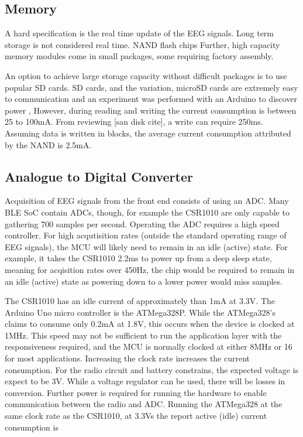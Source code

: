 \documentclass[]{article}
\begin{document}
\subsection{Memory}

 A hard specification is the real time update of the \ac{EEG} signals. Long term storage is not considered real time. NAND flash chips  Further, high capacity memory modules come in small packages, some requiring factory assembly. 

An option to achieve large storage capacity without difficult packages is to use popular SD cards. SD cards, and the variation, microSD cards are extremely easy to communication and an experiment was performed with an Arduino to discover power , However, during reading and writing the current consumption is between 25 to 100mA. From reviewing [san disk cite], a write can require 250ms. Assuming data is written in blocks, the average current consumption attributed by the NAND is 2.5mA. 



\subsection{Analogue to Digital Converter}

Acquisition of \ac{EEG} signals from the front end consists of using an \ac{ADC}. Many \ac{BLE} \ac{SoC} contain \ac{ADC}s, though, for example the CSR1010 are only capable to gathering 700 samples per second. Operating the \ac{ADC} requires a high speed controller. For high acqutisition rates (outside the standard operating range of \ac{EEG} signals), the \ac{MCU} will likely need to remain in an idle (active) state. For example, it takes the CSR1010 2.2ms to power up from a deep sleep state, meaning for acqisition rates over 450Hz, the chip would be required to remain in an idle (active) state as powering down to a lower power would miss samples. 

The CSR1010 has an idle current of approximately than 1mA at 3.3V. The Arduino Uno micro controller is the ATMega328P. While the ATMega328's claims to consume only 0.2mA at 1.8V, this occurs when the device is clocked at 1MHz. This speed may not be sufficient to run the application layer with the responsiveness required, and the \ac{MCU} is normally clocked at either 8MHz or 16 for most applications. Increasing the clock rate increases the current consumption. For the radio circuit and battery constrains, the expected voltage is expect to be 3V. While a voltage regulator can be used, there will be losses in conversion.   Further power is required for running the hardware to enable communication between the radio and ADC. Running the ATMega328 at the same clock rate as the CSR1010, at 3.3Vs the report active (idle) current consumption is 
\end{document}
